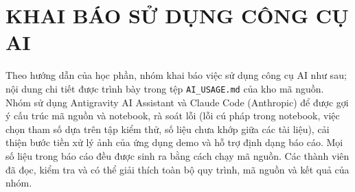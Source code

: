\documentclass[a4paper,oneside]{report}
\begin{document}
\chapter{KHAI BÁO SỬ DỤNG CÔNG CỤ AI}

Theo hướng dẫn của học phần, nhóm khai báo việc sử dụng công cụ AI như sau; nội dung chi tiết được trình bày trong
tệp \nolinkurl{AI_USAGE.md} của kho mã nguồn. Nhóm sử dụng Antigravity AI Assistant và Claude Code (Anthropic) để
được gợi ý cấu trúc mã nguồn và notebook, rà soát lỗi (lỗi cú pháp trong notebook, việc chọn tham số dựa trên tập
kiểm thử, số liệu chưa khớp giữa các tài liệu), cải thiện bước tiền xử lý ảnh của ứng dụng demo và hỗ trợ định
dạng báo cáo. Mọi số liệu trong báo cáo đều được sinh ra bằng cách chạy mã nguồn. Các thành viên đã đọc, kiểm tra
và có thể giải thích toàn bộ quy trình, mã nguồn và kết quả của nhóm.
\end{document}
